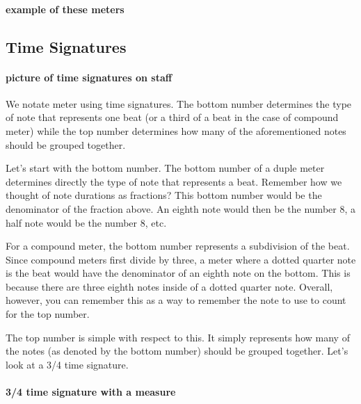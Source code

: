 \documentclass[../OpenAppliedMusicTheory.tex]{subfiles}
\begin{document}
        \paragraph{example of these meters}

        \subsection{Time Signatures}
        \paragraph{picture of time signatures on staff}
        We notate meter using time signatures. The bottom number determines the type of note that represents one beat (or a third of a beat in the case of compound meter) while the top number determines how many of the aforementioned notes should be grouped together.

        Let's start with the bottom number. The bottom number of a duple meter determines directly the type of note that represents a beat. Remember how we thought of note durations as fractions? This bottom number would be the denominator of the fraction above. An eighth note would then be the number 8, a half note would be the number 8, etc. 

        For a compound meter, the bottom number represents a  subdivision of the beat. Since compound meters first divide by three, %
        a meter where a dotted quarter note is the beat would have the denominator of an eighth note on the bottom. This is because there are three eighth notes inside of a dotted quarter note. Overall, however, you can remember this as a way to remember the note to use to count for the top number. %

        The top number is simple with respect to this. It simply represents how many of the notes (as denoted by the bottom number) should be grouped together. Let's look at a 3/4 time signature.
        
        \paragraph{3/4 time signature with a measure}
        
\end{document}
